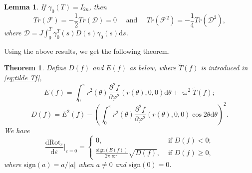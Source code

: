 \documentclass[11pt]{amsart}
\newcommand{\ep}{\varepsilon}
\newcommand{\om}{\varpi}
\newtheorem{thm}{Theorem}[section]
\newtheorem{lemma}{Lemma}[section]
\begin{document}
\begin{lemma}\label{lemma: trace formular2}
	\cite[Corollary 1.3]{HOW15} If $\gamma_{0}(T)=I_{2n}$, then 
	\begin{equation*}
		Tr(\mathcal{F})=-\frac{1}{2}Tr(\mathcal{D})=0\quad\text{ and   }\quad Tr(\mathcal{F}^{2})=-\frac{1}{4}Tr(\mathcal{D}^{2}),
	\end{equation*}
	where $\mathcal{D}=J\int_{0}^{T}\gamma_{0}^{T}(s)D(s)\gamma_{0}(s)\mathrm{d}s$.
\end{lemma}


Using the above results, we get the following theorem. 
\begin{thm}\label{thm:the derivative of rotation number}
	Define $D(f)$ and $E(f)$ as below, where $\tilde{T}(f)$ is introduced in \eqref{eq;tilde Tf}, 
	$$ E(f)=\int_{0}^{\pi}r^{2}(\theta)\frac{\partial^{2}f}{\partial\varphi^{2}}(r(\theta),0,0)\mathrm{d}\theta+\om^{2}\tilde{T}(f);$$
	$$ D(f)=E^2(f)-\left(\int_{0}^{\pi}r^{2}(\theta)\frac{\partial^{2}f}{\partial\varphi^{2}}(r(\theta),0,0)\cos2\theta\mathrm{d}\theta\right)^{2}.$$
	We have
	$$
	\frac{\mathrm{d}\text{Rot}_{\ep}}{\mathrm{d}\ep} |_{\ep=0} = \begin{cases}
		0, & \text{ if } D(f)<0; \\ 
		\frac{\text{sign}(E(f))}{2\pi\om^{2}}\sqrt{D(f)}, & \text{ if } D(f)\geq0,
	\end{cases} 
	$$where $\text{sign}(a)=a/|a|$ when $a\neq0$ and $\text{sign}(0)=0$.
\end{thm}
\end{document}
